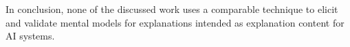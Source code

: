 In conclusion, none of the discussed work uses a comparable technique to elicit and validate mental models for explanations intended as explanation content for AI systems.

